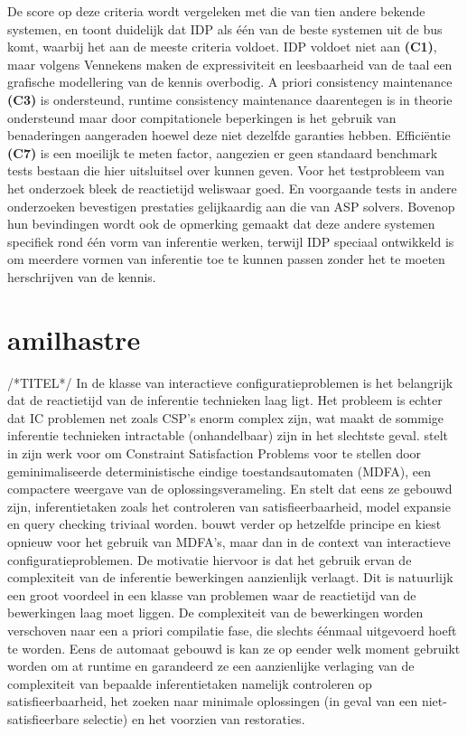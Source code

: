 De score op deze criteria wordt vergeleken met die van tien andere bekende systemen, en toont duidelijk dat IDP als \'{e}\'{e}n van de beste systemen uit de bus komt, waarbij het aan de meeste criteria voldoet. IDP voldoet niet aan \textbf{(C1)}, maar volgens Vennekens maken de expressiviteit en leesbaarheid van de taal een grafische modellering van de kennis overbodig. 
A priori consistency maintenance \textbf{(C3)} is ondersteund, runtime consistency maintenance daarentegen is in theorie ondersteund maar door compitationele beperkingen is het gebruik van benaderingen aangeraden hoewel deze niet dezelfde garanties hebben.
Effici\"{e}ntie \textbf{(C7)} is een moeilijk te meten factor, aangezien er geen standaard benchmark tests bestaan die hier uitsluitsel over kunnen geven. Voor het testprobleem van het onderzoek bleek de reactietijd weliswaar goed. En voorgaande tests in andere onderzoeken bevestigen prestaties gelijkaardig aan die van ASP solvers. 
Bovenop hun bevindingen wordt ook de opmerking gemaakt dat deze andere systemen specifiek rond \'{e}\'{e}n vorm van inferentie werken, terwijl IDP speciaal ontwikkeld is om meerdere vormen van inferentie toe te kunnen passen zonder het te moeten herschrijven van de kennis.

\section{amilhastre}
/*TITEL*/
In de klasse van interactieve configuratieproblemen is het belangrijk dat de reactietijd van de inferentie technieken laag ligt. Het probleem is echter dat IC problemen net zoals CSP's enorm complex zijn, wat maakt de sommige inferentie technieken intractable (onhandelbaar) zijn in het slechtste geval. \citep{vempaty1992solving} stelt in zijn werk voor om Constraint Satisfaction Problems voor te stellen door geminimaliseerde deterministische eindige toestandsautomaten (MDFA), een compactere weergave van de oplossingsverameling. En stelt dat eens ze gebouwd zijn, inferentietaken zoals het controleren van satisfieerbaarheid, model expansie en query checking triviaal worden. \citep{amilhastre2002consistency} bouwt verder op hetzelfde principe en kiest opnieuw voor het gebruik van MDFA's, maar dan in de context van interactieve configuratieproblemen. De motivatie hiervoor is dat het gebruik ervan de complexiteit van de inferentie bewerkingen aanzienlijk verlaagt. Dit is natuurlijk een groot voordeel in een klasse van problemen waar de reactietijd van de bewerkingen laag moet liggen. De complexiteit van de bewerkingen worden verschoven naar een a priori compilatie fase, die slechts \'{e}\'{e}nmaal uitgevoerd hoeft te worden. Eens de automaat gebouwd is kan ze op eender welk moment gebruikt worden om at runtime en garandeerd ze een aanzienlijke verlaging van de complexiteit van bepaalde inferentietaken namelijk controleren op satisfieerbaarheid, het zoeken naar minimale oplossingen (in geval van een niet-satisfieerbare selectie) en het voorzien van restoraties. 

